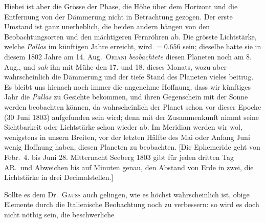 Hiebei ist aber die Grösse der Phase, die Höhe über dem Horizont und die Entfernung von der Dämmerung nicht in Betrachtung gezogen. Der erste Umstand ist ganz unerheblich, die beiden andern hängen von den Beobachtungsorten und den mächtigeren Fernröhren ab. Die grösste Lichtstärke, welche \textit{Pallas} im künftigen Jahre erreicht, wird $=0.656$ sein; dieselbe hatte sie in diesem 1802 Jahre am 14. Aug.\ \textsc{Oriani} \textit{beobachtete} diesen Planeten noch am 8. Aug., und \textit{sah} ihn mit Mühe den 17. und 18. dieses Monats, wozu aber wahrscheinlich die Dämmerung und der tiefe Stand des Planeten vieles beitrug. Es bleibt uns hienach noch immer die angenehme Hoffnung, dass wir künftiges Jahr die \textit{Pallas} zu Gesichte bekommen, und ihren Gegenschein mit der Sonne werden beobachten können, da wahrscheinlich der Planet schon vor dieser Epoche (30 Juni 1803) aufgefunden sein wird; denn mit der Zusammenkunft nimmt seine Sichtbarkeit oder Lichtstärke schon wieder ab. Im Meridian werden wir wol, wenigstens in unsern Breiten, vor der letzten Hälfte des Mai oder Anfang Juni wenig Hoffnung haben, diesen Planeten zu beobachten. [Die Ephemeride geht von Febr.\ 4. bis Juni 28. Mitternacht Seeberg 1803 gibt für jeden dritten Tag AR.\ und Abweichen bis auf Minuten genau, den Abstand von Erde in zwei, die Lichtstärke in drei Decimalstellen.]

Sollte es dem Dr.\ \textsc{Gauss} auch gelingen, wie es höchst wahrscheinlich ist, obige Elemente durch die Italienische Beobachtung noch zu verbessern: so wird es doch nicht nöthig sein, die beschwerliche

